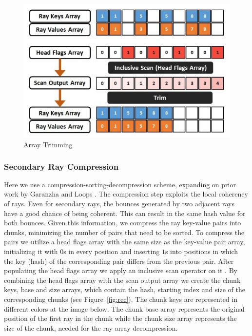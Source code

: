 \documentclass{egpubl}
\begin{document}
\begin{figure}[!htb]
    \centering
    \includegraphics[scale=0.50]{Images/Array_Trimming.jpg}
    \caption{\label{fig:at}Array Trimming}
\end{figure}

\subsubsection{Secondary Ray Compression}

Here we use a compression-sorting-decompression scheme, expanding on prior work by Garanzha and Loops \cite{Garanzha10}. The compression step exploits the local coherency of rays. Even for secondary rays, the bounces generated by two adjacent rays have a good chance of being coherent. This can result in the same hash value for both bounces. Given this information, we compress the ray key-value pairs into chunks, minimizing the number of pairs that need to be sorted. To compress the pairs we utilize a head flags array with the same size as the key-value pair array, initializing it with $0$s in every position and inserting $1$s into positions in which the key (hash) of the corresponding pair differs from the previous pair. After populating the head flags array we apply an inclusive scan operator on it \cite{Merrill09}. By combining the head flags array with the scan output array we create the chunk keys, base and size arrays, which contain the hash, starting index and size of the corresponding chunks (see Figure~\ref{fig:rcc}). The chunk keys are represented in different colors at the image below. The chunk base array represents the original position of the first ray in the chunk while the chunk size array represents the size of the chunk, needed for the ray array decompression.
\end{document}
